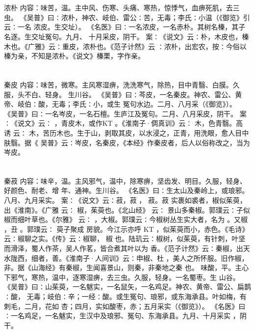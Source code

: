 \documentclass[12pt,UTF8]{ctexbook}
\begin{document}
\section{}浓朴
内容：味苦，温。主中风、伤寒、头痛、寒热，惊悸气，血痹死肌，去三虫。 
《吴普》曰∶浓朴，神农、岐伯、雷公∶苦，无毒；李氏∶小温（《御览》引云∶一名 
浓皮。生交址）。 
《名医》曰∶一名浓皮，一名赤朴。其树名榛，其子名逐。生交址冤句。九月、 
十月采皮，阴干。 
案∶《说文》云∶朴，木皮也，榛木也。《广雅》云∶重皮，浓朴也。《范子计然》云 
∶浓朴，出宏农，按∶今俗以榛为亲，不知是浓朴。《说文》榛栗，字作亲。 


\section{}秦皮
内容：味苦，微寒。主风寒湿痹，洗洗寒气，除热，目中青翳、白膜。久服，头不白、轻身。 
生川谷。 
《吴普》曰∶芩皮，一名秦皮。神农、雷公、黄帝、岐伯∶酸，无毒；李氏∶小，或生 
冤句水边。二月、八月采（《御览》）。 
《吴普》曰∶一名岑皮，一名石檀。生庐江及冤句。二月、八月采皮，阴干。 
案∶《说文》云∶ ，青皮木，或作KT 。《淮南子·倜真训》云∶ 木，色青翳。高 
诱 
云∶ 木，苦历木也。生于山，剥取其皮，以水浸之，正青，用洗眼，愈人目中肤翳。据《 
吴普》云∶岑皮，名秦皮，《本经》作秦皮者，后人以俗称改之，当为岑皮。 


\section{}秦菽
内容：味辛，温。主风邪气，温中，除寒痹，坚齿发、明目。久服，轻身、好颜色、耐老、增 
年、通神。生川谷。 
《名医》曰∶生太山及秦岭上，或琅邪。八月、九月采实。 
案∶《说文》云∶菽，菽 ， 菽。菽 实裹如裘者，椒似茱萸，出《淮南》。《广雅 
云∶ 椒，茱萸也。《北山经》 
云∶ 
景山多秦椒。郭璞云∶子似椒而细叶草也。《尔雅》 
云∶ ，大椒。郭璞云∶今椒树丛生实大者，名为 。又椒 ，丑 。郭璞云∶ 萸子聚成 
房貌。今江示亦呼 KT ，似茱萸而小，赤色。《毛诗》云∶椒聊之实。《传》云∶椒聊， 
椒 
也。陆玑云∶椒树，似茱萸，有针刺，叶坚而滑泽，蜀人作茶，吴人作茗，皆合煮其叶以为 
香。《范子计然》云∶秦椒，出天水陇西，细者，善。《淮南子·人间训》云∶申椒、杜 
，美人之所怀服。旧作椒，非。据《山海经》有秦椒，生闻喜景山，则秦，非秦地之秦 
也。 
味酸，平。主心下邪气，寒热，温中，逐寒湿痹，去三虫。久服，轻身。一名蜀枣。生 
山谷。 
《吴普》曰∶山茱萸，一名魃实，一名鼠矢，一名鸡足。神农、黄帝、雷公、扁鹊∶酸， 
无毒；岐伯∶辛；一经∶酸。或生冤句、琅邪，或东海承县。叶如梅，有刺毛，二月，花如 
杏；四月，实如酸枣，赤；五月采实（《御览》）。 
《名医》曰∶一名鸡足，一名魃实，生汉中及琅邪、冤句、东海承县。九月、十月采实 
，阴干。 
\end{document}
